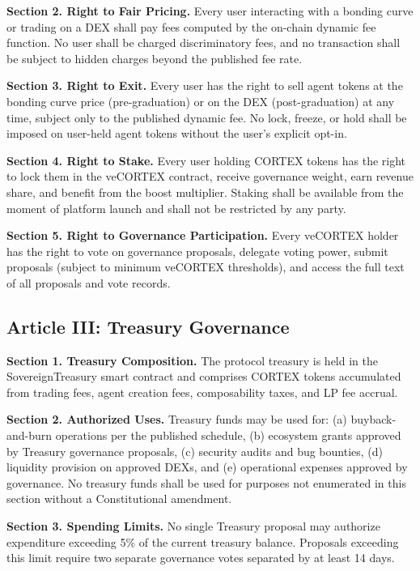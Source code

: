 \textbf{Section 2. Right to Fair Pricing.} Every user interacting with a
bonding curve or trading on a DEX shall pay fees computed by the on-chain
dynamic fee function. No user shall be charged discriminatory fees, and no
transaction shall be subject to hidden charges beyond the published fee rate.

\textbf{Section 3. Right to Exit.} Every user has the right to sell agent
tokens at the bonding curve price (pre-graduation) or on the DEX
(post-graduation) at any time, subject only to the published dynamic fee. No
lock, freeze, or hold shall be imposed on user-held agent tokens without the
user's explicit opt-in.

\textbf{Section 4. Right to Stake.} Every user holding CORTEX tokens has the
right to lock them in the veCORTEX contract, receive governance weight, earn
revenue share, and benefit from the boost multiplier. Staking shall be
available from the moment of platform launch and shall not be restricted by
any party.

\textbf{Section 5. Right to Governance Participation.} Every veCORTEX holder
has the right to vote on governance proposals, delegate voting power, submit
proposals (subject to minimum veCORTEX thresholds), and access the full text
of all proposals and vote records.

\subsection*{Article III: Treasury Governance}

\textbf{Section 1. Treasury Composition.} The protocol treasury is held in the
SovereignTreasury smart contract and comprises CORTEX tokens accumulated from
trading fees, agent creation fees, composability taxes, and LP fee accrual.

\textbf{Section 2. Authorized Uses.} Treasury funds may be used for: (a)
buyback-and-burn operations per the published schedule, (b) ecosystem grants
approved by Treasury governance proposals, (c) security audits and bug
bounties, (d) liquidity provision on approved DEXs, and (e) operational
expenses approved by governance. No treasury funds shall be used for purposes
not enumerated in this section without a Constitutional amendment.

\textbf{Section 3. Spending Limits.} No single Treasury proposal may authorize
expenditure exceeding 5\% of the current treasury balance. Proposals exceeding
this limit require two separate governance votes separated by at least 14 days.

